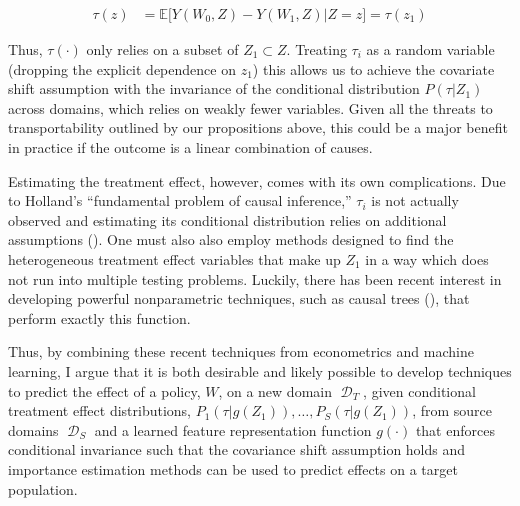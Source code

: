 \documentclass[a4paper,12pt]{article}
\DeclareMathOperator*{\D}{\mathcal{D}}
\begin{document}
\begin{align*}
\tau(z) &= \mathbb{E} \big[ Y(W_0, Z) - Y(W_1, Z) | Z = z \big] = \tau(z_1)
\end{align*}

Thus, $\tau(\cdot)$ only relies on a subset of $Z_1 \subset Z$. Treating $\tau_i$ as a random variable (dropping the explicit dependence on $z_1$) this allows us to achieve the covariate shift assumption with the invariance of the conditional distribution $P(\tau | Z_1)$ across domains, which relies on weakly fewer variables. Given all the threats to transportability outlined by our propositions above, this could be a major benefit in practice if the outcome is a linear combination of causes. 

Estimating the treatment effect, however, comes with its own complications. Due to Holland's \parencite*{Holland1986} ``fundamental problem of causal inference,'' $\tau_i$ is not actually observed and estimating its conditional distribution relies on additional assumptions (\cite{Firpo2007}). One must also also employ methods designed to find the heterogeneous treatment effect variables that make up $Z_1$ in a way which does not run into multiple testing problems. Luckily, there has been recent interest in developing powerful nonparametric techniques, such as causal trees (\cite{Athey2016}), that perform exactly this function.

Thus, by combining these recent techniques from econometrics and machine learning, I argue that it is both desirable and likely possible to develop techniques to predict the effect of a policy, $W$, on a new domain $\D_T$, given conditional treatment effect distributions, $P_1(\tau | g(Z_1)),\ldots, P_S(\tau | g(Z_1))$, from source domains $\D_S$ and a learned feature representation function $g(\cdot)$ that enforces conditional invariance such that the covariance shift assumption holds and importance estimation methods can be used to predict effects on a target population. 






 

\end{document}
